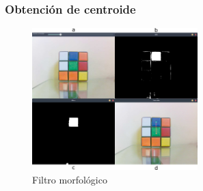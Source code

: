 \documentclass[11pt]{beamer}
\begin{document}
  \begin{frame}
    \frametitle{Obtención de centroide}
    \begin{figure}[h]
      \includegraphics[height=5.5cm, keepaspectratio]{images/centroide.png}
      \caption{Filtro morfológico}
    \end{figure}
  \end{frame}
  
\end{document}
